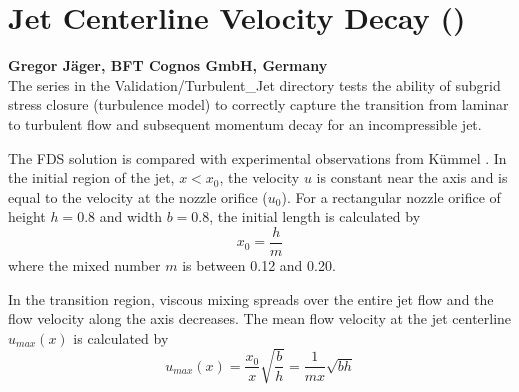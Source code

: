 \documentclass[11pt]{book}
\begin{document}
\clearpage


\section{Jet Centerline Velocity Decay (\texorpdfstring{}{jet})}

\textbf{Gregor J\"ager, BFT Cognos GmbH, Germany}\\

\noindent The  series in the Validation/Turbulent\_Jet directory tests the ability of subgrid stress closure (turbulence model) to correctly capture the transition from laminar to turbulent flow and subsequent momentum decay for an incompressible jet.

The FDS solution is compared with experimental observations from K\"ummel \cite{Kummel:2007}. In the initial region of the jet, $x<x_0$, the velocity $u$ is constant near the axis and is equal to the velocity at the nozzle orifice ($u_0$). For a rectangular nozzle orifice of height $h = 0.8$ and width $b = 0.8$, the initial length is calculated by
\begin{equation}
x_0 = \frac{h}{m}
\end{equation}
where the mixed number $m$ is between 0.12 and 0.20.

In the transition region, viscous mixing spreads over the entire jet flow and the flow velocity along the axis decreases. The mean flow velocity at the jet centerline $u_{max}(x)$ is calculated by
\begin{equation}
u_{max}(x) =    \frac{x_0}{x}\sqrt{\frac{b}{h}} = \frac{1}{mx} \sqrt{bh}
\end{equation}
\end{document}
